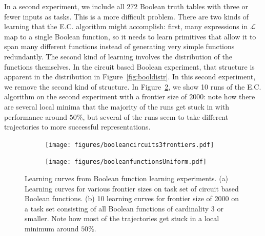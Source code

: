 \documentclass{article}
\begin{document}
In a second experiment, we include all $272$ Boolean truth tables with
three or fewer inputs as tasks. This is a more difficult
problem. There are two kinds of learning that the E.C. algorithm might
accomplish: first, many expressions in $\mathcal{L}$ map to a single
Boolean function, so it needs to learn primitives that allow it to
span many different functions instead of generating very simple
functions redundantly. The second kind of learning involves the
distribution of the functions themselves. In the circuit based Boolean
experiment, that structure is apparent in the distribution in
Figure~\ref{fig:booldistr}. In this second experiment, we remove the
second kind of structure. In
Figure~\ref{fig:boolLearningCurvesUniform}, we show 10 runs of the
E.C.  algorithm on the second experiment with a frontier size of
$2000$: note how there are several local minima that the majority of
the runs get stuck in with performance around $50\%$, but several of
the runs seem to take different trajectories to more successful
representations.

\vspace{-.3cm}
\begin{figure}[h]
\begin{subfigure}{.1\linewidth}
\caption{\label{fig:boolLearningCurvesCircuits} }
\end{subfigure}
\begin{subfigure}[Before]{0.9\linewidth}
\texttt{[image: figures/booleancircuits3frontiers.pdf]}
\end{subfigure}

\vspace{-.32cm}
\begin{subfigure}{.1\linewidth}
\caption{\label{fig:boolLearningCurvesUniform}}
\end{subfigure}
\begin{subfigure}[After]{.9\linewidth}
\texttt{[image: figures/booleanfunctionsUniform.pdf]}

\end{subfigure}
\caption{Learning curves from Boolean function learning
  experiments. (a) Learning curves for various frontier sizes on task
  set of circuit based Boolean functions. (b) 10
  learning curves for frontier size of 2000 on a task set consisting
  of all Boolean functions of cardinality 3 or smaller. Note how most
  of the trajectories get stuck in a local minimum around
  $50\%$.\label{fig:boolLearningCurves}}
\end{figure}
\end{document}
